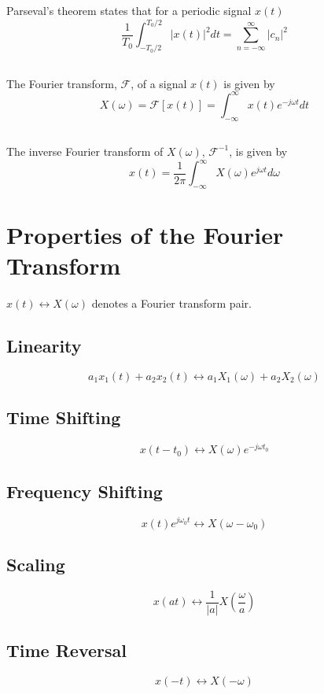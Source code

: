 \documentclass[]{article}
\begin{document}
\begin{multicols}{2}
\subsection{}
Parseval's theorem states that for a periodic signal $x(t)$
\[ \frac{1}{T_{0}} \int_{-T_{0}/2}^{T_{0}/2} |x(t)|^2dt = \sum_{n=-\infty}^{\infty} |c_{n}|^2 \]

\subsection{}
The Fourier transform, $\mathcal{F}$, of a signal $x(t)$ is given by
\[ X(\omega) = \mathcal{F}[x(t)] = \int_{-\infty}^{\infty}x(t)e^{-j\omega t}dt \]

\subsection{}
The inverse Fourier transform of $X(\omega)$,  $\mathcal{F}^{-1}$, is given by
\[ x(t) = \frac{1}{2\pi} \int_{-\infty}^{\infty}X(\omega)e^{j\omega t} d\omega \]

\section{Properties of the Fourier Transform}
$ x(t) \longleftrightarrow X(\omega)$ denotes a Fourier transform pair.
\subsection{Linearity}
\[ a_{1} x_{1}(t) + a_{2} x_{2}(t) \longleftrightarrow a_{1} X_{1}(\omega) + a_{2} X_{2}(\omega) \]
\subsection{Time Shifting}
\[ x(t-t_{0}) \longleftrightarrow X(\omega)e^{-j\omega t_{0}} \]
\subsection{Frequency Shifting}
\[ x(t)e^{j\omega_{0} t} \longleftrightarrow X(\omega - \omega_{0}) \]
\subsection{Scaling}
\[ x(at) \longleftrightarrow \frac{1}{|a|}X(\frac{\omega}{a}) \]
\subsection{Time Reversal}
\[ x(-t) \longleftrightarrow X(-\omega) \]

\end{multicols}
\end{document}
